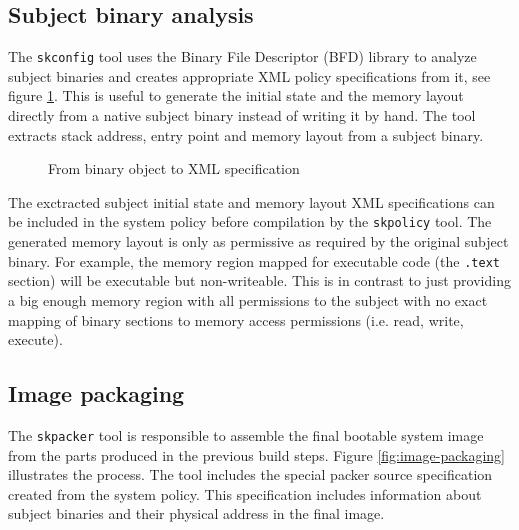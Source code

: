 \subsection{Subject binary analysis}\label{subsec:subject-binary-analysis}
The \texttt{skconfig} tool uses the Binary File Descriptor (BFD)
library to analyze subject binaries and creates appropriate XML
policy specifications from it, see figure \ref{fig:object-analysis}. This is
useful to generate the initial state and the memory layout directly from a
native subject binary instead of writing it by hand. The tool extracts stack
address, entry point and memory layout from a subject binary.

\begin{figure}[h]
	\centering
	\caption{From binary object to XML specification}
	\label{fig:object-analysis}
\end{figure}

The exctracted subject initial state and memory layout XML specifications can be
included in the system policy before compilation by the \texttt{skpolicy} tool.
The generated memory layout is only as permissive as required by the original
subject binary. For example, the memory region mapped for executable code
(the \texttt{.text} section) will be executable but non-writeable. This is in
contrast to just providing a big enough memory region with all permissions to
the subject with no exact mapping of binary sections to memory access
permissions (i.e. read, write, execute).

\subsection{Image packaging}\label{subsec:image-packaging}
The \texttt{skpacker} tool is responsible to assemble the final bootable system
image from the parts produced in the previous build steps. Figure
\ref{fig:image-packaging} illustrates the process. The tool includes the special
packer source specification created from the system policy. This specification
includes information about subject binaries and their physical address in the
final image.

